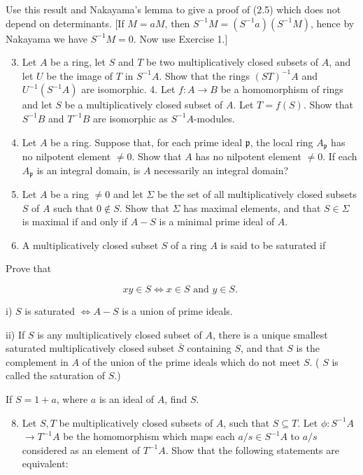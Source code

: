 \documentclass{standalone}
\theoremstyle{definition}
\theoremstyle{remark}
\begin{document}
Use this result and Nakayama's lemma to give a proof of (2.5) which does not depend on determinants. [If $M=a M$, then $S^{-1} M=\left(S^{-1} a\right)\left(S^{-1} M\right)$, hence by Nakayama we have $S^{-1} M=0$. Now use Exercise 1.]

\begin{enumerate}
  \setcounter{enumi}{2}
  \item Let $A$ be a ring, let $S$ and $T$ be two multiplicatively closed subsets of $A$, and let $U$ be the image of $T$ in $S^{-1} A$. Show that the rings $(S T)^{-1} A$ and $U^{-1}\left(S^{-1} A\right)$ are isomorphic. 4. Let $f: A \rightarrow B$ be a homomorphism of rings and let $S$ be a multiplicatively closed subset of $A$. Let $T=f(S)$. Show that $S^{-1} B$ and $T^{-1} B$ are isomorphic as $S^{-1} A$-modules.

  \item Let $A$ be a ring. Suppose that, for each prime ideal $\mathfrak{p}$, the local ring $A_{\mathfrak{p}}$ has no nilpotent element $\neq 0$. Show that $A$ has no nilpotent element $\neq 0$. If each $A_{\mathfrak{p}}$ is an integral domain, is $A$ necessarily an integral domain?

  \item Let $A$ be a ring $\neq 0$ and let $\Sigma$ be the set of all multiplicatively closed subsets $S$ of $A$ such that $0 \notin S$. Show that $\Sigma$ has maximal elements, and that $S \in \Sigma$ is maximal if and only if $A-S$ is a minimal prime ideal of $A$.

  \item A multiplicatively closed subset $S$ of a ring $A$ is said to be saturated if

\end{enumerate}

Prove that

\[
x y \in S \Leftrightarrow x \in S \text { and } y \in S \text {. }
\]

i) $S$ is saturated $\Leftrightarrow A-S$ is a union of prime ideals.

ii) If $S$ is any multiplicatively closed subset of $A$, there is a unique smallest saturated multiplicatively closed subset $\bar{S}$ containing $S$, and that $S$ is the complement in $A$ of the union of the prime ideals which do not meet $S$. ( $S$ is called the saturation of $S$.)

If $S=1+a$, where $a$ is an ideal of $A$, find $S$.

\begin{enumerate}
  \setcounter{enumi}{7}
  \item Let $S, T$ be multiplicatively closed subsets of $A$, such that $S \subseteq T$. Let $\phi: S^{-1} A$ $\rightarrow T^{-1} A$ be the homomorphism which maps each $a / s \in S^{-1} A$ to $a / s$ considered as an element of $T^{-1} A$. Show that the following statements are equivalent:
\end{enumerate}
\end{document}
